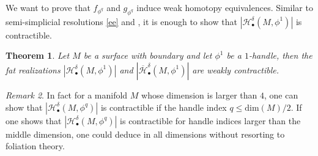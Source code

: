 \documentclass[a4paper]{amsart}
\newtheorem{thm}{Theorem}[section]
\theoremstyle{definition}
\theoremstyle{remark}
\newtheorem{rem}[thm]{Remark}
\numberwithin{equation}{section}
\begin{document}
We want to prove that $f_{\phi^q}$ and $g_{\phi^q}$ induce weak homotopy equivalences. Similar to semi-simplicial resolutions \ref{ee} and , it is enough to show that $|\mathcal{H}_{\bullet}^{\delta}(M,\phi^1)|$ is contractible. 
\begin{thm}\label{eq:7}
Let $M$ be a surface with boundary and let $\phi^1$ be a $1$-handle, then the fat realizations $|\mathcal{H}_{\bullet}^{\delta}(M,\phi^1)|$ and $|\overline{\mathcal{H}}^{\delta}_{\bullet}(M,\phi^1)|$ are weakly contractible.
\end{thm}
\begin{rem}\label{rem1}
In fact for a manifold $M$ whose dimension is larger than $4$, one can show that $|\mathcal{H}_{\bullet}^{\delta}(M,\phi^q)|$ is contractible if the handle index $q\leq \text{dim}(M)/2$. If one shows that $|\mathcal{H}_{\bullet}^{\delta}(M,\phi^q)|$ is contractible for handle indices larger than the middle dimension, one could deduce  in all dimensions without resorting to foliation theory.
\end{rem}
\end{document}
